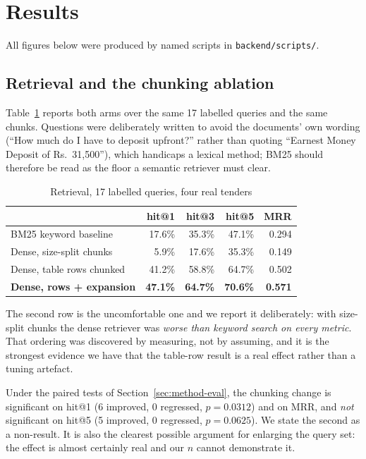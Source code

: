 \documentclass[conference]{IEEEtran}
\begin{document}
\section{Results}
\label{sec:results}

All figures below were produced by named scripts in \texttt{backend/scripts/}.

\subsection{Retrieval and the chunking ablation}

Table~\ref{tab:retrieval} reports both arms over the same 17 labelled queries
and the same chunks. Questions were deliberately written to avoid the documents'
own wording (``How much do I have to deposit upfront?'' rather than quoting
``Earnest Money Deposit of Rs.\ 31,500''), which handicaps a lexical method;
BM25 should therefore be read as the floor a semantic retriever must clear.

\begin{table}[htbp]
\caption{Retrieval, 17 labelled queries, four real tenders}
\label{tab:retrieval}
\centering
\begin{tabular}{@{}lrrrr@{}}
\toprule
 & hit@1 & hit@3 & hit@5 & MRR \\
\midrule
BM25 keyword baseline            & 17.6\% & 35.3\% & 47.1\% & 0.294 \\
Dense, size-split chunks         & \phantom{0}5.9\% & 17.6\% & 35.3\% & 0.149 \\
Dense, table rows chunked        & 41.2\% & 58.8\% & 64.7\% & 0.502 \\
\textbf{Dense, rows + expansion} & \textbf{47.1\%} & \textbf{64.7\%} & \textbf{70.6\%} & \textbf{0.571} \\
\bottomrule
\end{tabular}
\end{table}

The second row is the uncomfortable one and we report it deliberately: with
size-split chunks the dense retriever was \emph{worse than keyword search on
every metric}. That ordering was discovered by measuring, not by assuming, and
it is the strongest evidence we have that the table-row result is a real effect
rather than a tuning artefact.

Under the paired tests of Section~\ref{sec:method-eval}, the chunking change is
significant on hit@1 (6 improved, 0 regressed, $p=0.0312$) and on MRR, and
\emph{not} significant on hit@5 (5 improved, 0 regressed, $p=0.0625$). We state
the second as a non-result. It is also the clearest possible argument for
enlarging the query set: the effect is almost certainly real and our $n$ cannot
demonstrate it.
\end{document}
